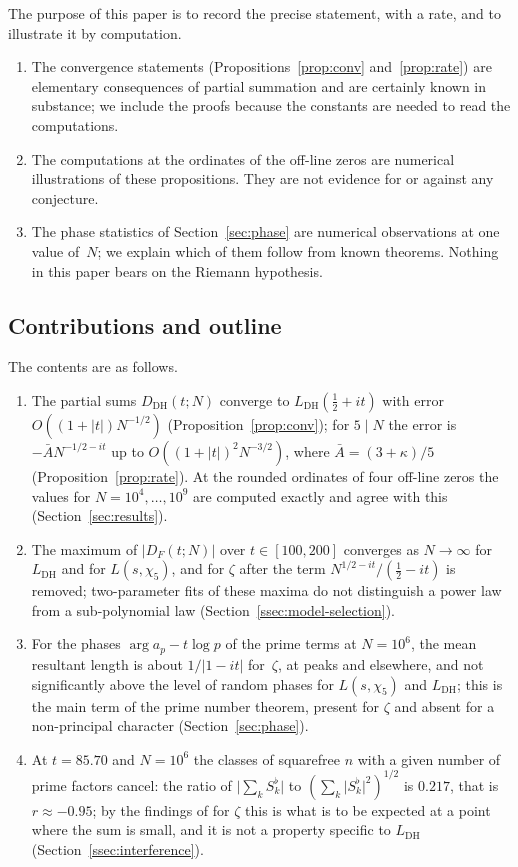 \documentclass[11pt]{amsart}
\theoremstyle{definition}
\theoremstyle{remark}
\renewcommand{\DH}{\mathrm{DH}}
\newcommand{\abs}[1]{\lvert #1 \rvert}
\newcommand{\Abar}{\bar A}
\begin{document}
The purpose of this paper is to record the precise statement, with a rate,
and to illustrate it by computation.
\begin{enumerate}[label=(\roman*)]
  \item The convergence statements (Propositions~\ref{prop:conv}
    and~\ref{prop:rate}) are elementary consequences of partial summation
    and are certainly known in substance; we include the proofs because
    the constants are needed to read the computations.
  \item The computations at the ordinates of the off-line zeros are
    numerical illustrations of these propositions.  They are not evidence
    for or against any conjecture.
  \item The phase statistics of Section~\ref{sec:phase} are numerical
    observations at one value of~$N$; we explain which of them follow from
    known theorems.  Nothing in this paper bears on the Riemann hypothesis.
\end{enumerate}

\subsection{Contributions and outline}

The contents are as follows.
\begin{enumerate}
  \item The partial sums $D_{\DH}(t;N)$ converge to $L_{\DH}(\tfrac12+it)$
    with error $O((1+\abs t)N^{-1/2})$ (Proposition~\ref{prop:conv}); for
    $5\mid N$ the error is $-\Abar N^{-1/2-it}$ up to
    $O((1+\abs t)^2N^{-3/2})$, where $\Abar=(3+\kappa)/5$
    (Proposition~\ref{prop:rate}).  At the rounded ordinates of four
    off-line zeros the values for $N=10^4,\dots,10^9$ are computed exactly
    and agree with this (Section~\ref{sec:results}).
  \item The maximum of $\abs{D_F(t;N)}$ over $t\in[100,200]$ converges as
    $N\to\infty$ for $L_{\DH}$ and for $L(s,\chi_5)$, and for $\zeta$
    after the term $N^{1/2-it}/(\tfrac12-it)$ is removed; two-parameter
    fits of these maxima do not distinguish a power law from a
    sub-polynomial law (Section~\ref{ssec:model-selection}).
  \item For the phases $\arg a_p-t\log p$ of the prime terms at $N=10^6$,
    the mean resultant length is about $1/\abs{1-it}$ for~$\zeta$, at
    peaks and elsewhere, and not significantly above the level of random phases for
    $L(s,\chi_5)$ and $L_{\DH}$; this is the main term of the prime number
    theorem, present for $\zeta$ and absent for a non-principal character
    (Section~\ref{sec:phase}).
  \item At $t=85.70$ and $N=10^6$ the classes of squarefree $n$ with a
    given number of prime factors cancel: the ratio of
    $\abs{\sum_kS_k^\flat}$ to $(\sum_k\abs{S_k^\flat}^2)^{1/2}$ is
    $0.217$, that is $r\approx-0.95$; by the findings of
    \cite{TrejoSignNote} for $\zeta$ this is what is to be expected at a
    point where the sum is small, and it is not a property specific to
    $L_{\DH}$ (Section~\ref{ssec:interference}).
\end{enumerate}
\end{document}
